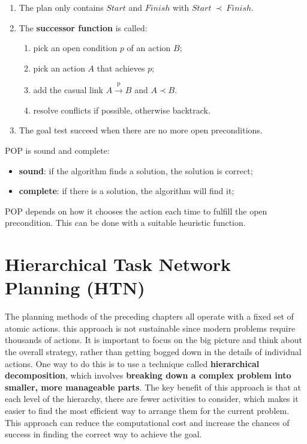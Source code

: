 \documentclass{article}
\begin{document}
\begin{enumerate}
    \item The plan only contains $Start$ and $Finish$ with $Start\ \prec\ Finish$.
    \item The \textbf{successor function} is called:
    \begin{enumerate}
        \item pick an open condition $p$ of an action $B$;
        \item pick an action $A$ that achieves $p$;
        \item add the casual link $A \xrightarrow{\text{p}} B$ and $A \prec B$.
        \item resolve conflicts if possible, otherwise backtrack.
    \end{enumerate}
    \item The goal test succeed when there are no more open preconditions.
\end{enumerate}

POP is sound and complete: 
\begin{itemize}
    \item \textbf{sound}: if the algorithm finds a solution, the solution is correct;
    \item \textbf{complete}: if there is a solution, the algorithm will find it;
\end{itemize}

POP depends on how it chooses the action each time to fulfill the open precondition. This can be done with a suitable heuristic function.

\newpage

\section{Hierarchical Task Network Planning (HTN)}

The planning methods of the preceding chapters all operate with a fixed set of atomic actions. this approach is not sustainable since modern problems require thousands of actions. It is important to focus on the big picture and think about the overall strategy, rather than getting bogged down in the details of individual actions. One way to do this is to use a technique called \textbf{hierarchical decomposition}, which involves \textbf{breaking down a complex problem into smaller, more manageable parts}. The key benefit of this approach is that at each level of the hierarchy, there are fewer activities to consider, which makes it easier to find the most efficient way to arrange them for the current problem. This approach can reduce the computational cost and increase the chances of success in finding the correct way to achieve the goal. \\
\end{document}
